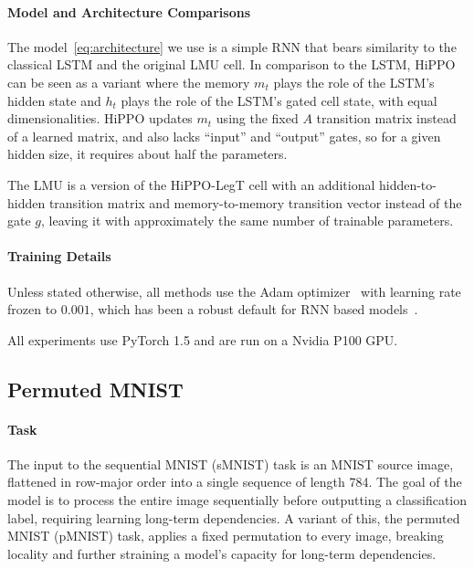 \documentclass[../hippo.tex]{subfiles}
\begin{document}
\paragraph{Model and Architecture Comparisons}
The model~\eqref{eq:architecture} we use is a simple RNN that bears similarity to the classical LSTM and the original LMU cell.
In comparison to the LSTM, HiPPO can be seen as a variant where the memory $m_t$ plays the role of the LSTM's hidden state and $h_t$ plays the role of the LSTM's gated cell state, with equal dimensionalities.
HiPPO updates $m_t$ using the fixed $A$ transition matrix instead of a learned matrix, and also lacks ``input'' and ``output'' gates, so for a given hidden size, it requires about half the parameters.

The LMU is a version of the HiPPO-LegT cell with an additional hidden-to-hidden transition matrix and memory-to-memory transition vector instead of the gate $g$, leaving it with approximately the same number of trainable parameters.

\paragraph{Training Details}
Unless stated otherwise, all methods use the Adam optimizer~\citep{kingma2014adam} with learning rate frozen to $0.001$, which has been a robust default for RNN based models~\citep{voelker2019legendre, gu2020improving}.

All experiments use PyTorch 1.5 and are run on a Nvidia P100 GPU.









\subsection{Permuted MNIST}
\label{sec:pmnist-details}

\paragraph{Task}
The input to the sequential MNIST (sMNIST) task \cite{le2015simple} is an MNIST source image,
flattened in row-major order into a single sequence of length 784.
The goal of the model is to process the entire image sequentially before
outputting a classification label, requiring learning long-term dependencies.
A variant of this, the permuted MNIST (pMNIST) task, applies a fixed permutation
to every image, breaking locality and further straining a model's capacity for
long-term dependencies.
\end{document}
